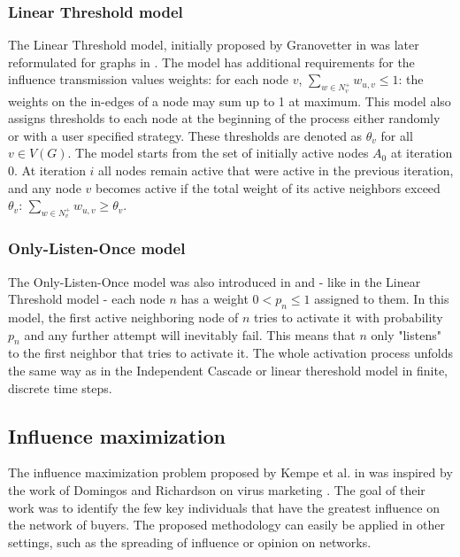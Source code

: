 \documentclass[pdflatex,sn-mathphys-ay]{sn-jnl}
\begin{document}

\subsubsection{Linear Threshold model}

The Linear Threshold model, initially proposed by Granovetter in \citep{granovetter} was later reformulated for graphs in \citep{kempe}. The model has additional requirements for the influence transmission values weights: for each node $v$, $\sum_{w \in N^+_v} w_{u,v} \leq 1$: the weights on the in-edges of a node may sum up to 1 at maximum. This model also assigns thresholds to each node at the beginning of the process either randomly or with a user specified strategy. These thresholds are denoted as $\theta_v$ for all $v \in V(G)$. The model starts from the set of initially active nodes $A_0$ at iteration $0$. At iteration $i$ all nodes remain active that were active in the previous iteration, and any node $v$ becomes active if the total weight of its active neighbors exceed $\theta_v$: $\sum_{w \in N^+_v} w_{u,v} \geq \theta_v$.


\subsubsection{Only-Listen-Once model}

The Only-Listen-Once model was also introduced in \citep{kempe} and - like in the Linear Threshold model - each node $n$ has a weight $0 < p_{n} \leq 1$ assigned to them. In this model, the first active neighboring node of $n$ tries to activate it with probability $p_{n}$ and any further attempt will inevitably fail. This means that $n$ only "listens" to the first neighbor that tries to activate it. The whole activation process unfolds the same way as in the Independent Cascade or linear thereshold model in finite, discrete time steps.


\subsection{Influence maximization}\label{subsec_infmax}

The influence maximization problem proposed by Kempe et al. in \citep{kempe} was inspired by the work of Domingos and Richardson on virus marketing \citep{domingos}. The goal of their work was to identify the few key individuals that have the greatest influence on the network of buyers. The proposed methodology can easily be applied in other settings, such as the spreading of influence or opinion on networks.
\end{document}

